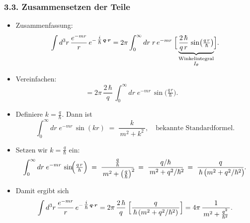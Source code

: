 \documentclass{scrartcl}
\begin{document}
\subsubsection*{3.3. Zusammensetzen der Teile}
\begin{itemize}
  \item Zusammenfassung: 
  \[
    \int d^{3}r\,\frac{e^{-m r}}{r}\,e^{-\,\tfrac{i}{\hbar}\,\boldsymbol{q}\cdot\boldsymbol{r}}
    = 
    2\pi \int_{0}^{\infty} dr \; r \,e^{-m r}\;
    \Bigl[\,\underbrace{\frac{2\,\hbar}{q\,r}\,\sin\bigl(\tfrac{q\,r}{\hbar}\bigr)}_{\substack{\text{Winkelintegral}\\I_{\theta}}}\Bigr].
  \]
  \item Vereinfachen:
  \[
    = 
    2\pi \,\frac{2\,\hbar}{q}\,
    \int_{0}^{\infty} dr \; e^{-m r}\,\sin\!\bigl(\tfrac{q\,r}{\hbar}\bigr).
    \quad %
  \]
  \item Definiere $k = \frac{q}{\hbar}$. Dann ist
  \[
    \int_{0}^{\infty} dr \; e^{-m r}\,\sin(k r)
    \;=\;
    \frac{k}{\,m^{2} + k^{2}\,},
    \quad\text{bekannte Standardformel.}
  \]
  \item Setzen wir $k = \tfrac{q}{\hbar}$ ein:
  \[
    \int_{0}^{\infty} dr \; e^{-m r}\,\sin\!\Bigl(\tfrac{q\,r}{\hbar}\Bigr)
    \;=\;
    \frac{\tfrac{q}{\hbar}}{\,m^{2} + \bigl(\tfrac{q}{\hbar}\bigr)^{2}\!}
    \;=\;
    \frac{q/\hbar}{\,m^{2} + q^{2}/\hbar^{2}\!}
    \;=\;
    \frac{q}{\,\hbar\,\bigl(m^{2} + q^{2}/\hbar^{2}\bigr)\!}.
  \]
  \item Damit ergibt sich
  \[
    \int d^{3}r\,\frac{e^{-m r}}{r}\,e^{-\,\tfrac{i}{\hbar}\,\boldsymbol{q}\cdot\boldsymbol{r}}
    = 
    2\pi \,\frac{2\,\hbar}{q}
    \;\Bigl[\frac{q}{\,\hbar\,(m^{2} + q^{2}/\hbar^{2})\,}\Bigr]
    = 
    4\pi\,\frac{1}{\,m^{2} + \tfrac{q^{2}}{\hbar^{2}}\,}.
  \]
\end{itemize}

\end{document}
